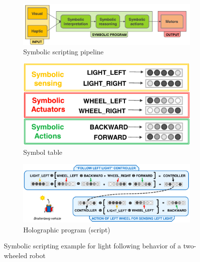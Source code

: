 \documentclass[conference]{IEEEtran}
\begin{document}
\begin{figure}[th!]
	\center
	\begin{subfigure}{1\columnwidth}
		\includegraphics[width=\columnwidth]{img/control_pipeline.png}
		\caption{Symbolic scripting pipeline}
		\label{fig:symbolic-scripting-a}
	\end{subfigure}
	
	
	\begin{subfigure}{0.7\columnwidth}
		\center
		\includegraphics[width=\columnwidth]{img/symbol_table.png}
		\caption{Symbol table}
		\label{fig:symbolic-scripting-b}
	\end{subfigure}
	\begin{subfigure}{1\columnwidth}
		\includegraphics[width=\columnwidth]{img/controller.png}
		\caption{Holographic program (script)}
		\label{fig:symbolic-scripting-c}
	\end{subfigure}
	\caption{Symbolic scripting example for light following behavior of a two-wheeled robot}
	\label{fig:symbolic-scripting}
\end{figure}
\end{document}
